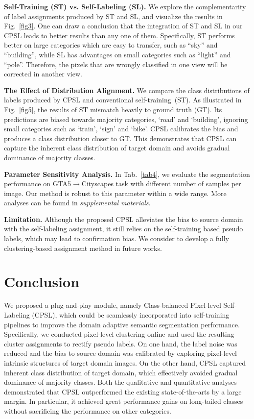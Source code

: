 \documentclass[10pt,twocolumn,letterpaper]{article}
\begin{document}
	\vspace{0.1em}	\noindent\textbf{Self-Training (ST) vs. Self-Labeling (SL).} We explore the complementarity of label assignments produced by ST and SL, and visualize the results in Fig.~\ref{fig3}. One can draw a conclusion that the integration of ST and SL in our CPSL leads to better results than any one of them. Specifically, ST performs better on large categories which are easy to transfer, such as ``sky'' and ``building'', while SL has advantages on small categories such as ``light'' and ``pole''. Therefore, the pixels that are wrongly classified in one view will be corrected in another view.
	
	\vspace{0.1em}\noindent\textbf{The Effect of Distribution Alignment.} We compare the class distributions of labels produced by CPSL and conventional self-training~(ST). As illustrated in Fig.~\ref{fig5}, the results of ST mismatch heavily to ground truth (GT). Its predictions are biased towards majority categories, \eg `road' and `building', ignoring small categories such as `train', `sign' and `bike'. CPSL calibrates the bias and produces a class distribution closer to GT. This demonstrates that CPSL can capture the inherent class distribution of target domain and avoids gradual dominance of majority classes.
	
	\vspace{0.1em}\noindent\textbf{Parameter Sensitivity Analysis.} In Tab.~\ref{tab4}, we evaluate the segmentation performance on GTA5$\to$Cityscapes task with different number of samples per image. Our method is robust to this parameter within a wide range. More analyses can be found in \textit{supplemental materials}. 
	
	\vspace{0.1em}\noindent\textbf{Limitation.} Although the proposed CPSL alleviates the bias to source domain with the self-labeling assignment, it still relies on the self-training based pseudo labels, which may lead to confirmation bias. We consider to develop a fully clustering-based assignment method in future works.
	
	\section{Conclusion}
	We proposed a plug-and-play module, namely Class-balanced Pixel-level Self-Labeling (CPSL), which could be seamlessly incorporated into self-training pipelines to improve the domain adaptive semantic segmentation performance. Specifically, we conducted pixel-level clustering online and used the resulting cluster assignments to rectify pseudo labels. On one hand, the label noise was reduced and the bias to source domain was calibrated by exploring pixel-level intrinsic structures of target domain images. On the other hand, CPSL captured inherent class distribution of target domain, which effectively avoided gradual dominance of majority classes. Both the qualitative and quantitative analyses demonstrated that CPSL outperformed the existing state-of-the-arts by a large margin. In particular, it achieved great performance gains on long-tailed classes without sacrificing the performance on other categories.
	
\end{document}
